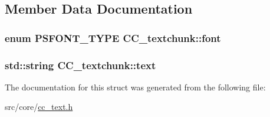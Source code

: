 \subsection{Member Data Documentation}
\hypertarget{a00047_a1ef2f15168ff93edf3564e41fbdf6765}{
\subsubsection[{font}]{\setlength{\rightskip}{0pt plus 5cm}enum {\bf P\-S\-F\-O\-N\-T\-\_\-\-T\-Y\-P\-E} C\-C\-\_\-textchunk\-::font}}\label{a00047_a1ef2f15168ff93edf3564e41fbdf6765}
\hypertarget{a00047_a5cd97d642e840fb66412eed1ab65916d}{
\subsubsection[{text}]{\setlength{\rightskip}{0pt plus 5cm}std\-::string C\-C\-\_\-textchunk\-::text}}\label{a00047_a5cd97d642e840fb66412eed1ab65916d}


The documentation for this struct was generated from the following file\-:\begin{DoxyCompactItemize}
\item 
src/core/\hyperlink{a00215}{cc\-\_\-text.\-h}\end{DoxyCompactItemize}

